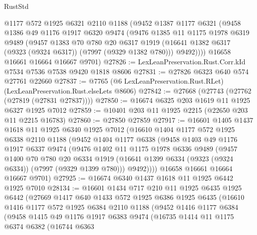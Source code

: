 \begin{lexlean}{RustStd}
\begin{coremodule}
{\begin{coremodule}
{{{{{{{{{{{{{{{{{{{{{{{{{{{{{{{{{{{{{{{{{{{      @1177
      @572
      @1925
      @6321
      @2110
      @1188
      (@9452
        @1387
        @1177
        @6321
        (@9458
          @1386
          @49
          @1176
          @1917
          @6320
          @9474
          (@9476
            @1385
            @11
            @1175
            @1978
            @6319
            @9489
            (@9457
              @1383
              @70
              @780
              @20
              @6317
              @1919
              (@16641 @1382 @6317 (@9323 (@9324 @6317)) (@7997 (@9329 @1382 @780)))
              @9492))))
      @16658
      @16661
      @16664
      @16667
      @9701)
@27826 := LexLeanPreservation.Rust.Corr.kId @7534 @7536 @7538 @9420 @1818 @8606
@27831 := @27826 @6323 @640 @574 @27761 @22660
@27837 := @7765 (@6 LexLeanPreservation.Rust.RLet) (LexLeanPreservation.Rust.elseLets @8606)
@27842 := @27668 (@27743 (@27762 (@27819 (@27831 @27837))))
@27850 := @16674 @6325 @203 @1619 @11 @1925 @6327 @1925 @7012
@27859 := @10401 @203 @11 @1925 @2215 (@22650 @203 @11 @2215 @16783)
@27860 := @27850 @27859
@27917 := @16601
    @1405
    @1437
    @1618
    @11
    @1925
    @6340
    @1925
    @7012
    (@16610
      @1404
      @1177
      @572
      @1925
      @6338
      @2110
      @1188
      (@9452
        @1404
        @1177
        @6338
        (@9458
          @1403
          @49
          @1176
          @1917
          @6337
          @9474
          (@9476
            @1402
            @11
            @1175
            @1978
            @6336
            @9489
            (@9457
              @1400
              @70
              @780
              @20
              @6334
              @1919
              (@16641 @1399 @6334 (@9323 (@9324 @6334)) (@7997 (@9329 @1399 @780)))
              @9492))))
      @16658
      @16661
      @16664
      @16667
      @9701)
@27925 := @16674 @6340 @1437 @1618 @11 @1925 @6442 @1925 @7010
@28134 := @16601
    @1434
    @717
    @210
    @11
    @1925
    @6435
    @1925
    @6442
    (@27669
      @1417
      @640
      @1433
      @572
      @1925
      @6386
      @1925
      @6435
      (@16610
        @1416
        @1177
        @572
        @1925
        @6384
        @2110
        @1188
        (@9452
          @1416
          @1177
          @6384
          (@9458
            @1415
            @49
            @1176
            @1917
            @6383
            @9474
            (@16735
              @1414
              @11
              @1175
              @6374
              @6382
              (@16744
                @6363
}}}}}}}}}}}}}}}}}}}}}}}}}}}}}}}}}}}}}}}}}}}
\end{coremodule}}
\end{coremodule}
\end{lexlean}
